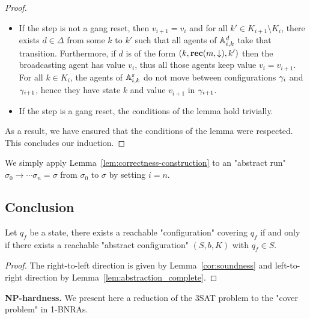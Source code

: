 \begin{proof}
\begin{itemize}
		\item If the step is not a gang reset, then $v_{i+1} = v_i$ and for all $k' \in K_{i+1} \setminus K_i$, there exists $d \in \Delta$ from some $k$ to $k'$ such that all agents of $\mathbb{A}_{i,k}^d$ take that transition. Furthermore, if $d$ is of the form $(k,\textbf{rec}(m, \downarrow),k')$ then the broadcasting agent has value $v_i$, thus all those agents keep value $v_i = v_{i+1}$. For all $k \in K_{i}$, the agents of $\mathbb{A}_{i,k}^\varepsilon$ do not move between configurations $\gamma_{i}$ and $\gamma_{i+1}$, hence they have state $k$ and value $v_{i+1}$ in $\gamma_{i+1}$.
		
		\item If the step is a gang reset, the conditions of the lemma hold trivially.
	\end{itemize}
	
	As a result, we have ensured that the conditions of the lemma were respected.
	This concludes our induction.
\end{proof}


We simply apply Lemma~\ref{lem:correctness-construction} to an "abstract run" $\sigma_0 \to \cdots \sigma_n = \sigma$ from $\sigma_0$ to $\sigma$ by setting $i = n$.

\subsection{Conclusion}


\begin{proposition}
	\label{prop:sound-and-complete}
	Let $q_f$ be a state, there exists a reachable "configuration" covering $q_f$ if and only if there exists a reachable "abstract configuration" $(S,b,K)$ with $q_f \in S$.
\end{proposition}

\begin{proof}
	The right-to-left direction is given by Lemma~\ref{cor:soundness} and left-to-right direction by Lemma~\ref{lem:abstraction_complete}.
\end{proof}




\textbf{NP-hardness.} We present here a reduction of the 3SAT problem to the "cover problem" in 1-BNRAs.

